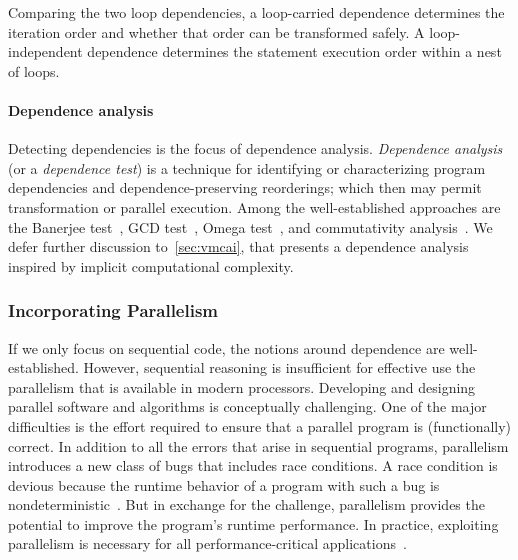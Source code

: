 Comparing the two loop dependencies, a loop-carried dependence determines the iteration order and whether that order can be transformed safely.
A loop-independent dependence determines the statement execution order within a nest of loops.

\paragraph*{Dependence analysis}
Detecting dependencies is the focus of dependence analysis.
\emph{Dependence analysis} (or a \emph{dependence test})
is a technique for identifying or characterizing program dependencies and dependence-preserving reorderings;
which then may permit transformation or parallel execution.
Among the well-established approaches are
the Banerjee test~\cite{banerjee1997},
GCD test~\cite{zima199},
Omega test~\cite{pugh1991},
and commutativity analysis~\cite{rinard1996}.
We defer further discussion to~\autoref{sec:vmcai}, that presents a dependence analysis inspired by implicit computational complexity.

\subsubsection{Incorporating Parallelism}

If we only focus on sequential code, the notions around dependence are well-established.
However, sequential reasoning is insufficient for effective use the parallelism that is available in modern processors.
Developing and designing parallel software and algorithms is conceptually challenging.
One of the major difficulties is the effort required to ensure that a parallel program is (functionally) correct.
In addition to all the errors that arise in sequential programs, parallelism introduces a new class of bugs that includes race conditions.
A race condition is devious because the runtime behavior of a program with such a bug is nondeterministic~\cite[p. 32]{chapman2007}.
But in exchange for the challenge, parallelism provides the potential to improve the program's runtime performance.
In practice, exploiting parallelism is necessary for all performance-critical applications~\cite{suomela2022}.

